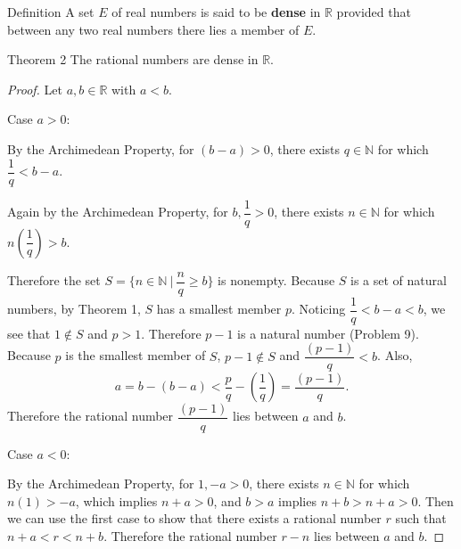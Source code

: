 \documentclass[a4paper,10pt]{book}
\theoremstyle{plain} %
\newcommand{\thistheoremname}{}
\newtheorem*{genericthm*}{\thistheoremname}
\newenvironment{namedthm*}[1]
	{\renewcommand{\thistheoremname}{#1}%
	\begin{genericthm*}}
	{\end{genericthm*}}
\begin{document}
\begin{flushleft}
\begin{namedthm*}{Definition}
A set $E$ of real numbers is said to be \textbf{dense} in $\mathbb{R}$ provided that between any two real numbers there lies a member of $E$.	
\end{namedthm*}

\begin{namedthm*}{Theorem 2}
The rational numbers are dense in $\mathbb{R}$.	
\end{namedthm*}
\begin{proof}
Let $a,b \in \mathbb{R}$ with $a<b$.\par
Case $a>0$:\par
By the Archimedean Property, for $(b-a)>0$, there exists $q \in \mathbb{N}$ for which $\dfrac{1}{q} < b-a$. \par
Again by the Archimedean Property, for $b,\dfrac{1}{q}>0$, there exists $n \in \mathbb{N}$ for which $n(\dfrac{1}{q})>b$.\par
Therefore the set $S=\{n \in \mathbb{N} \ |\ \dfrac{n}{q} \ge b \}$ is nonempty. Because $S$ is a set of natural numbers, by Theorem 1, $S$ has a smallest member $p$.
Noticing $\dfrac{1}{q} < b-a < b$, we see that $1 \notin S$ and $p>1$. Therefore $p-1$ is a natural number (Problem 9).
Because $p$ is the smallest member of $S$, $p-1 \notin S$ and $\dfrac{(p-1)}{q} < b$.
Also, 
\[
a = b-(b-a) < \dfrac{p}{q} - (\dfrac{1}{q}) = \dfrac{(p-1)}{q}.
\]
Therefore the rational number $\dfrac{(p-1)}{q}$ lies between $a$ and $b$.\par
Case $a<0$:\par
By the Archimedean Property, for $1,-a>0$, there exists $n \in \mathbb{N}$ for which $n(1) > -a$, which implies $n+a>0$, and $b>a$ implies $n+b>n+a>0$.
Then we can use the first case to show that there exists a rational number $r$ such that $n+a<r<n+b$. Therefore the rational number $r-n$ lies between $a$ and $b$.
\end{proof}

\end{flushleft}
\end{document}

